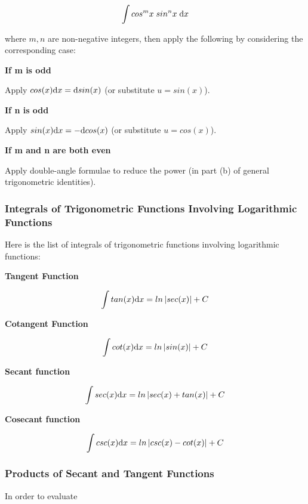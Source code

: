 \documentclass[a4paper,12pt]{article}
\begin{document}
$$\int cos^{m}x\; sin^{n}x\;\mathrm{d} x$$\s

where $m,n$ are non-negative integers, then apply the following by considering the corresponding case:

\begin{alist}
  \item \textbf{If m is odd}\n

  Apply $cos(x)\mathrm{d} x=\mathrm{d} sin(x)$ (or substitute $u=sin(x)$).

  \item \textbf{If n is odd}\n

  Apply $sin(x)\mathrm{d} x=-\mathrm{d} cos(x)$ (or substitute $u=cos(x)$).

  \item \textbf{If m and n are both even}\n

  Apply double-angle formulae to reduce the power (in part (b) of general trigonometric identities).
\end{alist}

\subsubsection{Integrals of Trigonometric Functions Involving Logarithmic Functions}
Here is the list of integrals of trigonometric functions involving logarithmic functions:

\begin{alist}
  \item \textbf{Tangent Function}\n

  $$\int tan(x)\mathrm{d} x=ln\left| sec(x)\right| +C$$

  \item \textbf{Cotangent Function}\n

  $$\int cot(x)\mathrm{d} x=ln\left| sin(x)\right| +C$$

  \item \textbf{Secant function}\n

  $$\int sec(x)\mathrm{d} x=ln\left| sec(x)+tan(x)\right| +C$$

  \item \textbf{Cosecant function}\n

  $$\int csc(x)\mathrm{d} x=ln\left| csc(x)-cot(x)\right| +C$$
\end{alist}

\subsubsection{Products of Secant and Tangent Functions}
In order to evaluate
\end{document}
